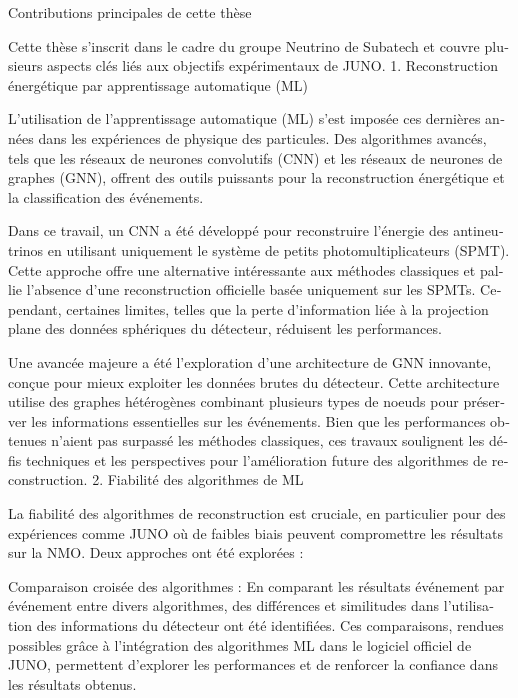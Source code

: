 \documentclass[../main.tex]{subfiles}
\begin{document}
\begin{otherlanguage}{french}


Contributions principales de cette thèse

Cette thèse s'inscrit dans le cadre du groupe Neutrino de Subatech et couvre plusieurs aspects clés liés aux objectifs expérimentaux de JUNO.
1. Reconstruction énergétique par apprentissage automatique (ML)

L'utilisation de l'apprentissage automatique (ML) s'est imposée ces dernières années dans les expériences de physique des particules. Des algorithmes avancés, tels que les réseaux de neurones convolutifs (CNN) et les réseaux de neurones de graphes (GNN), offrent des outils puissants pour la reconstruction énergétique et la classification des événements.

Dans ce travail, un CNN a été développé pour reconstruire l'énergie des antineutrinos en utilisant uniquement le système de petits photomultiplicateurs (SPMT). Cette approche offre une alternative intéressante aux méthodes classiques et pallie l'absence d'une reconstruction officielle basée uniquement sur les SPMTs. Cependant, certaines limites, telles que la perte d'information liée à la projection plane des données sphériques du détecteur, réduisent les performances.

Une avancée majeure a été l'exploration d'une architecture de GNN innovante, conçue pour mieux exploiter les données brutes du détecteur. Cette architecture utilise des graphes hétérogènes combinant plusieurs types de noeuds pour préserver les informations essentielles sur les événements. Bien que les performances obtenues n'aient pas surpassé les méthodes classiques, ces travaux soulignent les défis techniques et les perspectives pour l'amélioration future des algorithmes de reconstruction.
2. Fiabilité des algorithmes de ML

La fiabilité des algorithmes de reconstruction est cruciale, en particulier pour des expériences comme JUNO où de faibles biais peuvent compromettre les résultats sur la NMO. Deux approches ont été explorées :

    Comparaison croisée des algorithmes : En comparant les résultats événement par événement entre divers algorithmes, des différences et similitudes dans l'utilisation des informations du détecteur ont été identifiées. Ces comparaisons, rendues possibles grâce à l'intégration des algorithmes ML dans le logiciel officiel de JUNO, permettent d'explorer les performances et de renforcer la confiance dans les résultats obtenus.


\end{otherlanguage}
\end{document}
